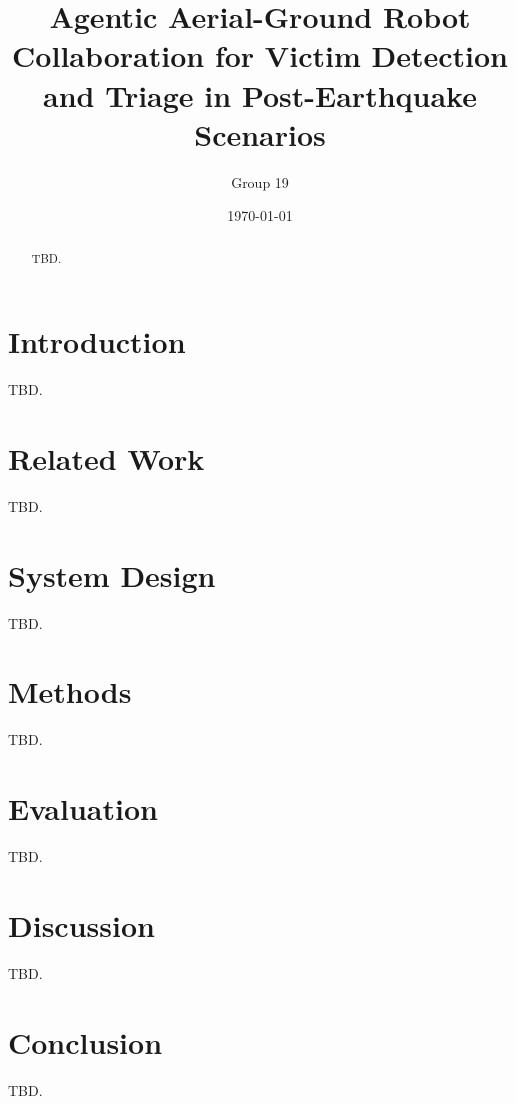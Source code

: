 \documentclass[11pt,a4paper]{article}
\title{Agentic Aerial-Ground Robot Collaboration for Victim Detection and Triage in Post-Earthquake Scenarios}
\author{Group 19}
\date{\today}
\begin{document}
\maketitle

\begin{abstract}
TBD.
\end{abstract}

\section{Introduction}
TBD.

\section{Related Work}
TBD.

\section{System Design}
TBD.

\section{Methods}
TBD.

\section{Evaluation}
TBD.

\section{Discussion}
TBD.

\section{Conclusion}
TBD.



\end{document}
